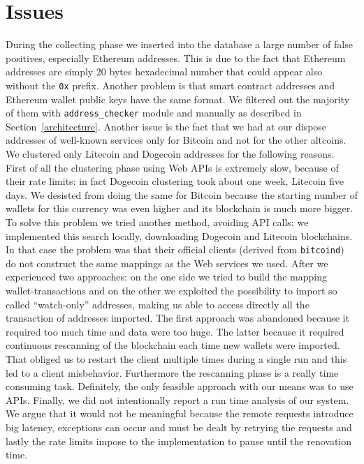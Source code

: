 \section{Issues} \label{sec:issues}
During the collecting phase we inserted into the database a large number of
false positives, especially Ethereum addresses. This is due to the fact that
Ethereum addresses are simply 20 bytes hexadecimal number that could appear
also without the \texttt{0x} prefix. Another problem is that smart contract
addresses and Ethereum wallet public keys have the same format. We filtered out
the majority of them with \texttt{address\_checker} module and manually as
described in Section~\ref{architecture}.
Another issue is the fact that we had at our dispose addresses
of well-known services only for Bitcoin and not for the other altcoins.
We clustered only Litecoin and Dogecoin addresses for the following reasons.
First of all the clustering phase using Web APIs is extremely slow, because of
their rate limits: in fact Dogecoin clustering took about one week, Litecoin
five days.
We desisted from doing the same for Bitcoin because the starting number of
wallets for this currency was even higher and its blockchain is much more
bigger. To solve this problem we tried another method, avoiding API calls: we
implemented this search locally, downloading Dogecoin and Litecoin blockchains.
In that case the problem was that their official clients (derived from
\texttt{bitcoind}) do not construct the same mappings as the Web services we
used. After we experienced two approaches: on the one side we tried to build the
mapping wallet-transactions and on the other we exploited the possibility to
import so called ``watch-only'' addresses, making us able to access directly
all the transaction of addresses imported.
The first approach was abandoned because it required too much time and data
were too huge. The latter because it required continuous rescanning of the
blockchain each time new wallets were imported. That obliged us to restart the
client multiple times during a single run and this led to a client misbehavior.
Furthermore the rescanning phase is a really time consuming task.
Definitely, the only feasible approach with our means was to use APIs.
Finally, we did not intentionally report a run time analysis of our
system. We argue that it would not be meaningful because the remote requests
introduce big latency, exceptions can occur and must be dealt by retrying 
the requests and lastly the rate limits impose to the implementation to pause
until the renovation time.